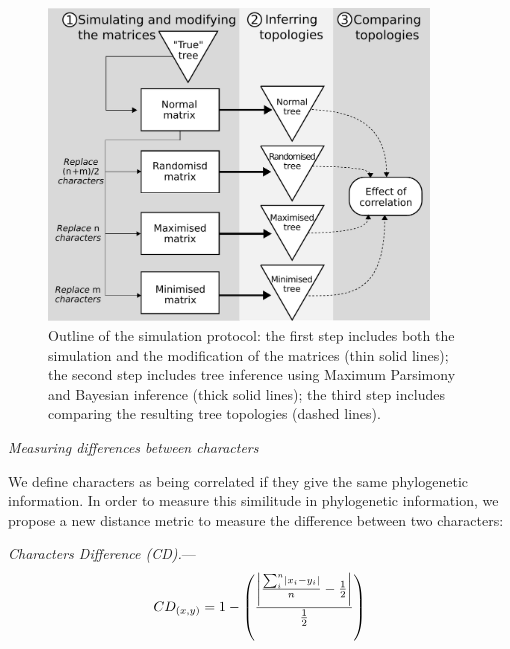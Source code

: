 \documentclass[12pt,letterpaper]{article}
\DeclarePairedDelimiter\abs{\lvert}{\rvert}%
\renewcommand{\subsection}[1]{%
\bigskip
\begin{center}
\begin{large}
\normalfont\itshape #1
\end{large}
\end{center}}
\renewcommand{\subsubsection}[1]{%
\vspace{2ex}
\noindent
\textit{#1.}---}
\begin{document}
\begin{figure}[!htbp]
\centering
   \includegraphics[width=0.9\textwidth]{Figures/outline.pdf}
\caption{Outline of the simulation protocol: the first step includes both the simulation and the modification of the matrices (thin solid lines); the second step includes tree inference using Maximum Parsimony and Bayesian inference (thick solid lines); the third step includes comparing the resulting tree topologies (dashed lines).}
\label{Fig:outline}
\end{figure}

\subsection{Measuring differences between characters}
\label{CD_description}
We define characters as being correlated if they give the same phylogenetic information.
In order to measure this similitude in phylogenetic information, we propose a new distance metric to measure the difference between two characters:

\subsubsection{Characters Difference (CD)}
\begin{equation}
    CD_{(x,y)} = 1 - \left(\frac{\abs*{\frac{\sum_{i}^{n}\abs{x_{i} - y_{i}}}{n}-\frac{1}{2}}}{\frac{1}{2}}\right)
\end{equation}
\end{document}

